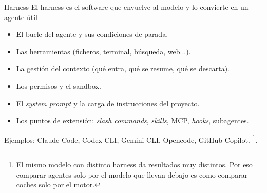 \begin{frame}{Harness}
El \alert{harness} es el \alert{software que envuelve al modelo} y lo convierte en un agente útil
 
\begin{itemize}
    \item El \alert{bucle del agente} y sus condiciones de parada.
    \item Las \alert{herramientas} (ficheros, terminal, búsqueda, web...).
    \item La \alert{gestión del contexto} (qué entra, qué se resume, qué se descarta).
    \item Los \alert{permisos y el sandbox}.
    \item El \textit{system prompt} y la carga de instrucciones del proyecto.
    \item Los \alert{puntos de extensión}: \textit{slash commands}, \textit{skills}, MCP, \textit{hooks}, subagentes.
\end{itemize}
 
Ejemplos: Claude Code, Codex CLI, Gemini CLI, Opencode, GitHub Copilot. \footnote{El mismo modelo con distinto harness da resultados muy distintos. Por eso comparar agentes solo por el modelo que llevan debajo es como comparar coches solo por el motor.}.
\end{frame}
 
